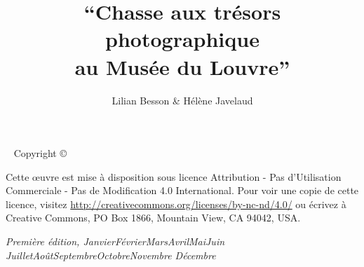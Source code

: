 \documentclass[a4-paper,11pt,justified]{tufte-book}
\title{``Chasse aux trésors photographique \\ au Musée du Louvre''}
\author{Lilian Besson \& Hélène Javelaud}
\newcommand{\monthyear}{%
  \ifcase\month\or Janvier\or Février\or Mars\or Avril\or Mai\or Juin\or
  Juillet\or Août\or Septembre\or Octobre\or Novembre\or
  Décembre\fi\space\number\year
}
\newcommand{\blankpage}{\newpage\hbox{}\thispagestyle{empty}\newpage}
\begin{document}


\maketitle


\newpage
\begin{fullwidth}
~\vfill
\thispagestyle{empty}
\setlength{\parindent}{0pt}
\setlength{\parskip}{\baselineskip}
Copyright \copyright\ \the\year\ \thanklessauthor


\par Cette œuvre est mise à disposition sous licence Attribution - Pas d'Utilisation Commerciale - Pas de Modification 4.0 International. Pour voir une copie de cette licence, visitez \url{http://creativecommons.org/licenses/by-nc-nd/4.0/} ou écrivez à Creative Commons, PO Box 1866, Mountain View, CA 94042, USA.

\par\textit{Première édition, \monthyear}
\end{fullwidth}

\tableofcontents




\cleardoublepage




\cleardoublepage




\cleardoublepage



\newpage
\blankpage
\end{document}
